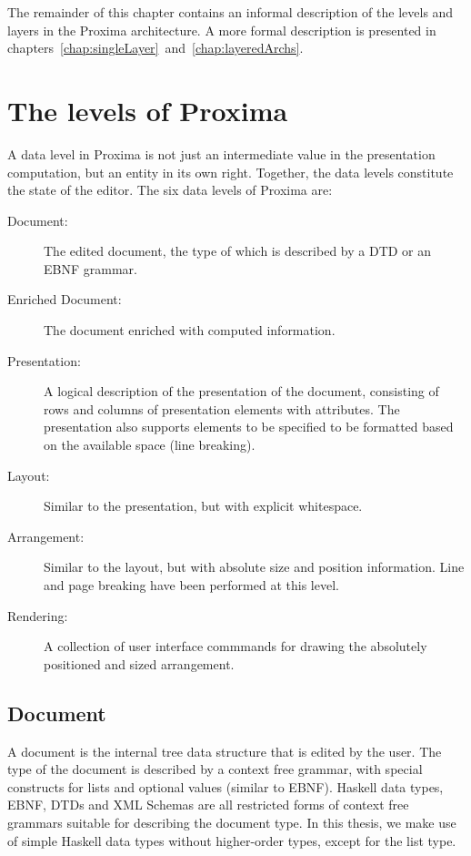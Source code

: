 The remainder of this chapter contains an informal description of the levels and layers in the Proxima architecture. A more formal description is presented in chapters~\ref{chap:singleLayer}~and~\ref{chap:layeredArchs}.


%																
%																
%																
\section{The levels of Proxima}

A data level in Proxima is not just an intermediate value in the presentation computation, but an entity in its own right. Together, the data levels constitute the state of the editor. The six data levels of Proxima are:

\begin{description}
\item[Document:] The edited document, the type of which is described by a DTD or an EBNF grammar.

\item[Enriched Document:] The document enriched with computed information.

\item[Presentation:] A logical description of the presentation of the document, consisting of rows and columns of presentation elements with attributes. The presentation also supports elements to be specified to be formatted based on the available space (line breaking).

\item[Layout:]  Similar to the presentation, but with explicit whitespace.

\item[Arrangement:] Similar to the layout, but with absolute size and position information. Line and page breaking have been performed at this level.

\item[Rendering:] A collection of user interface commmands for drawing the absolutely positioned and sized arrangement.
\end{description}


%																
\subsection{Document} \label {sect:docLevel}

A document is the internal tree data structure that is edited by the user. The type of the document is described by a context free grammar, with special constructs for lists and optional values (similar to EBNF). Haskell data types, EBNF, DTDs and XML Schemas are all restricted forms of context free grammars suitable for describing the document type. In this thesis, we make use of simple Haskell data types without higher-order types, except for the list type.

